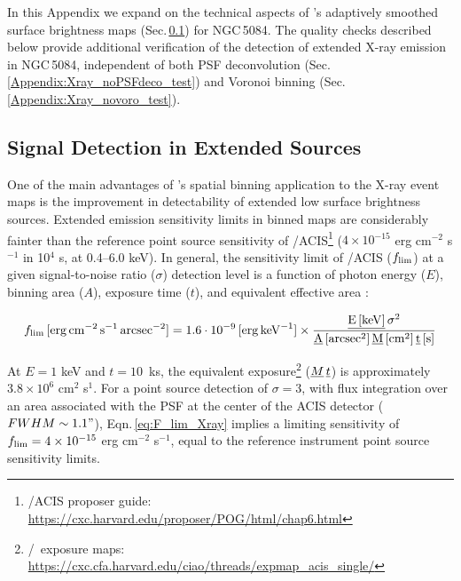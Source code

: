 \documentclass[modern]{CORE-AAS/aastex631}
\begin{document}
In this Appendix we expand on the technical aspects of \SAUNAS's \citep{borlaff+2024apj967_169} adaptively smoothed surface brightness maps (Sec.\,\ref{Appendix:xray_SNR}) for NGC\,5084. The quality checks described below provide additional verification of the detection of  extended X-ray emission in NGC\,5084, independent of both PSF deconvolution (Sec.\,\ref{Appendix:Xray_noPSFdeco_test}) and Voronoi binning (Sec.\,\ref{Appendix:Xray_novoro_test}).

\subsection{Signal Detection in Extended Sources}
\label{Appendix:xray_SNR}

One of the main advantages of \SAUNAS's spatial binning application to the X-ray event maps is the improvement in detectability of extended low surface brightness sources. Extended emission sensitivity limits in binned maps are considerably fainter than the reference point source sensitivity of \Chandra/ACIS\footnote{\Chandra/ACIS proposer guide: \url{https://cxc.harvard.edu/proposer/POG/html/chap6.html}} ($4\times10^{-15}$ erg cm$^{-2}$ s$^{-1}$ in 10$^4$ s, at 0.4--6.0 keV). In general, the sensitivity limit of \Chandra/ACIS ($f_{\rm lim}$) at a given signal-to-noise ratio ($\sigma$) detection level is a function of photon energy ($E$), binning area ($A$), exposure time ($t$), and equivalent effective area \citep[$M$, which has a complex variation with energy, see Fig.\,6 in][]{evans+2010apj189_37}:

\begin{equation}
\label{eq:F_lim_Xray}
f_{\rm{lim}}\,[\rm{erg}\,\rm{cm}^{-2}\,\rm{s}^{-1}\,\rm{arcsec}^{-2} ] =\\ 1.6\cdot10^{-9}\,[\rm{erg} \, \rm{keV}^{-1}] \times\frac{\emph{E\,[\rm{keV}]}\,\sigma^2}{\emph{A}\,[arcsec^2]\,\emph{M}\,[cm^2]\,\emph{t}\,[s]}
\end{equation}

At $E=1$ keV and $t=10$~ks, the equivalent exposure\footnote{\ciao/\Chandra\ exposure maps: \url{https://cxc.cfa.harvard.edu/ciao/threads/expmap_acis_single/}} ($\emph{M}\,\emph{t}$) is approximately $3.8\times10^{6}$ cm$^{2}$ s$^{1}$. For a point source detection of $\sigma=3$, with flux integration over an area associated with the PSF at the center of the ACIS detector ($FWHM\sim1.1"$), Eqn.\,\ref{eq:F_lim_Xray} implies a limiting sensitivity of $f_{\rm{lim}} = 4\times10^{-15}$ erg cm$^{-2}$ s$^{-1}$, equal to the reference instrument point source sensitivity limits.
\end{document}
